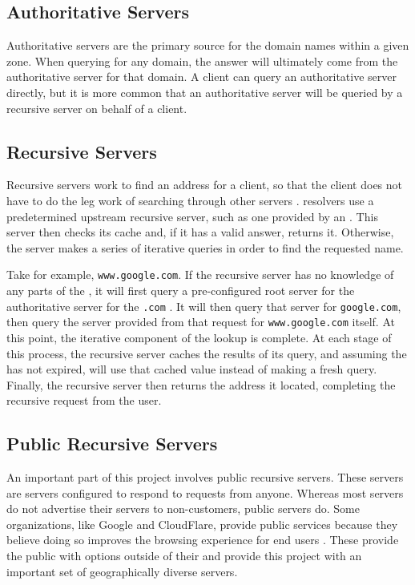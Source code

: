 \subsection{Authoritative Servers}
Authoritative servers are the primary source for the domain names within a given zone. When querying for any domain, the answer will ultimately come from the authoritative server for that domain. A \dns client can query an authoritative server directly, but it is more common that an authoritative server will be queried by a recursive server on behalf of a \dns client.

\subsection{Recursive Servers}
Recursive \dns servers work to find an \ip address for a client, so that the client does not have to do the leg work of searching through other \dns servers \cite{Cloudflarea}. \DNS resolvers use a predetermined upstream recursive \dns server, such as one provided by an \isp \cite{Oracle2010RecursiveWork}. This server then checks its cache and, if it has a valid answer, returns it. Otherwise, the server makes a series of iterative queries in order to find the requested name. 

Take for example, \texttt{www.google.com}. If the recursive server has no knowledge of any parts of the \acUrl, it will first query a pre-configured root \dns server for the authoritative server for the \texttt{.com} \tld. It will then query that server for \texttt{google.com}, then query the server provided from that request for \texttt{www.google.com} itself. At this point, the iterative component of the lookup is complete. At each stage of this process, the recursive server caches the results of its query, and assuming the \ttl has not expired, will use that cached value instead of making a fresh query. Finally, the recursive server then returns the \ip address it located, completing the recursive request from the user.

\subsection{Public Recursive \dns Servers}
An important part of this project involves public recursive \dns servers. These servers are \dns servers configured to respond to requests from anyone. Whereas most \isp servers do not advertise their \dns servers to non-customers, public servers do. Some organizations, like Google and CloudFlare, provide public \dns services because they believe doing so improves the browsing experience for end users \cite{GoogleIntroductionDNS}. These provide the public with \dns options outside of their \isp and provide this project with an important set of geographically diverse servers.
